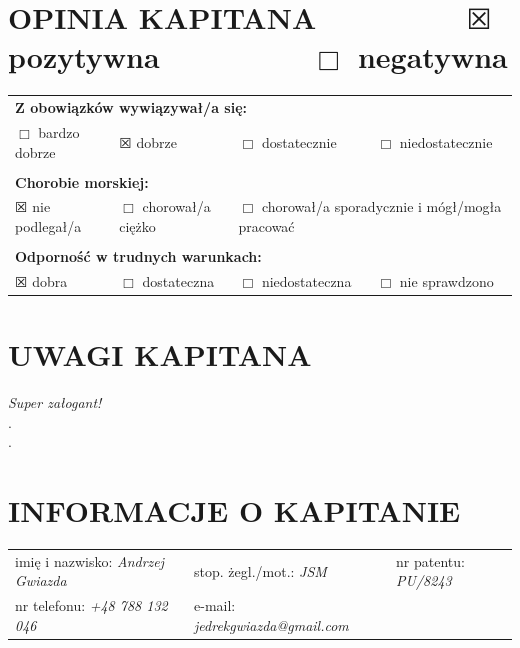 \documentclass{article}
\begin{document}
\section*{OPINIA KAPITANA ~~~~~~~~ $\XBox$ pozytywna ~~~~~~~~ $\Box$ negatywna}

\begin{tabularx}{\textwidth}{X X X X}
\multicolumn{4}{l}{\textbf{Z obowiązków wywiązywał/a się:}}\\
$\Box$ bardzo dobrze & $\XBox$ dobrze & $\Box$ dostatecznie & $\Box$ niedostatecznie\\
\\
\multicolumn{4}{l}{\textbf{Chorobie morskiej:}}\\
$\XBox$ nie podlegał/a & $\Box$ chorował/a ciężko & \multicolumn{2}{l}{$\Box$ chorował/a sporadycznie i mógł/mogła pracować}\\
\\
\multicolumn{4}{l}{\textbf{Odporność w trudnych warunkach:}}\\
$\XBox$ dobra & $\Box$ dostateczna & $\Box$ niedostateczna & $\Box$ nie sprawdzono\\
\end{tabularx}

\section*{UWAGI KAPITANA}


\textit{Super załogant!}\dotfill \\
.\dotfill \\
.\dotfill \\
\section*{INFORMACJE O KAPITANIE}
\begin{tabularx}{\textwidth}{X X X}
imię i nazwisko: \textit{Andrzej Gwiazda} & stop. żegl./mot.: \textit{JSM} & nr patentu: \textit{PU/8243} \\
nr telefonu: \textit{+48 788 132 046} & e-mail: \textit{jedrekgwiazda@gmail.com} \\
\end{tabularx}
\end{document}
